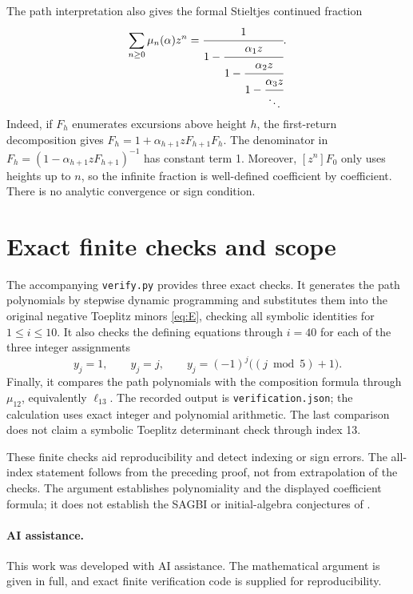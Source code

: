 \documentclass[11pt]{article}
\theoremstyle{remark}
\newcommand{\LH}{\ell}
\begin{document}
The path interpretation also gives the formal Stieltjes continued
fraction
\begin{equation}\label{eq:fraction}
 \sum_{n\ge0}\mu_n(\alpha)z^n
 =\cfrac{1}{1-\cfrac{\alpha_1z}{1-\cfrac{\alpha_2z}{1-\cfrac{\alpha_3z}{\ddots}}}}.
\end{equation}
Indeed, if $F_h$ enumerates excursions above height $h$, the first-return
decomposition gives $F_h=1+\alpha_{h+1}zF_{h+1}F_h$.
The denominator in $F_h=(1-\alpha_{h+1}zF_{h+1})^{-1}$ has constant
term 1. Moreover, $[z^n]F_0$ only uses heights up to $n$, so the infinite
fraction is well-defined coefficient by coefficient. There is no
analytic convergence or sign condition.

\section{Exact finite checks and scope}

The accompanying \texttt{verify.py} provides three exact checks. It
generates the path polynomials by stepwise dynamic programming and
substitutes them into the original negative Toeplitz minors
\eqref{eq:E}, checking all symbolic identities for $1\le i\le10$.
It also checks the defining equations through $i=40$ for each of the
three integer assignments
\[
 y_j=1,\qquad y_j=j,\qquad
 y_j=(-1)^j\bigl((j\bmod5)+1\bigr).
\]
Finally, it compares the path polynomials with the composition formula
through $\mu_{12}$, equivalently $\LH_{13}$. The recorded output is
\texttt{verification.json}; the calculation uses exact integer and
polynomial arithmetic. The last comparison does not claim a symbolic
Toeplitz determinant check through index 13.

These finite checks aid reproducibility and detect indexing or sign
errors. The all-index statement follows from the preceding proof, not
from extrapolation of the checks. The argument establishes polynomiality
and the displayed coefficient formula; it does not establish the SAGBI
or initial-algebra conjectures of \cite{Katthan}.

\paragraph{AI assistance.}
This work was developed with AI assistance. The mathematical argument
is given in full, and exact finite verification code is supplied for
reproducibility.
\end{document}
